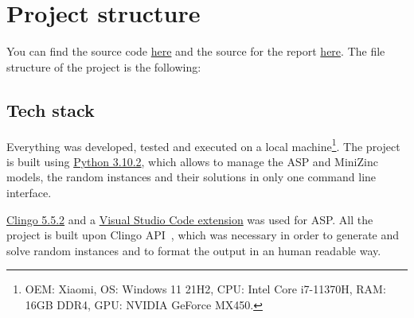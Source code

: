\section{Project structure}
You can find the source code \href{https://github.com/pinzauti/automated-reasoning}{here} and the source for the report \href{https://github.com/pinzauti/automated-reasoning-report}{here}.
The file structure of the project is the following:

\subsection{Tech stack}

Everything was developed, tested and executed on a local machine\footnote{OEM: Xiaomi, OS: Windows 11 21H2, CPU: Intel Core i7-11370H, RAM: 16GB DDR4, GPU: NVIDIA GeForce MX450.}. The project is built using \href{https://www.python.org/downloads/release/python-3102/}{Python 3.10.2}, which allows to manage the ASP and MiniZinc models, the random instances and their solutions in only one command line interface.

\href{https://github.com/potassco/clingo/releases/tag/v5.5.2}{Clingo 5.5.2} and a \href{https://marketplace.visualstudio.com/items?itemName=abelcour.asp-syntax-highlight}{Visual Studio Code extension} was used for ASP. All the project is built upon Clingo API~\cite{ClingoAPI}, which was necessary in order to generate and solve random instances and to format the output in an human readable way.

